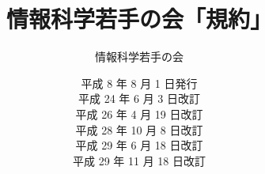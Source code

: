 %
%
%
%
\makeatletter
\def\labelenumi{第\theenumi 章　}
\def\theenumii{\arabic{enumii}}
\def\p@enumii{}
\def\labelenumii{第\theenumii 条　}
\def\theenumiii{\arabic{enumiii}}
\def\labelenumiii{\theenumiii　}
\def\p@enumiii{}
\makeatother
%
\def\@maketitle{
 \@title
 \@author
 \@date
 \vspace*{5cm}
}
\title{\Huge 情報科学若手の会「規約」}
\author{\huge 情報科学若手の会}
\date{\LARGE 平成   8 年  8 月   1 日発行\\
                         平成 24 年  6 月   3 日改訂\\
                         平成 26 年  4 月 19 日改訂\\
                         平成 28 年 10 月  8 日改訂\\
					     平成 29 年  6 月 18 日改訂\\
					     平成 29 年 11 月 18 日改訂}

